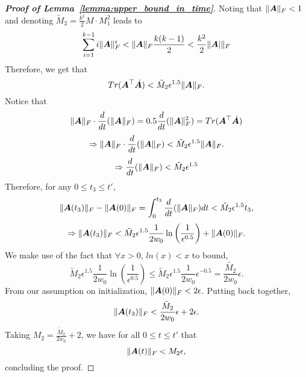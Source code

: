 \begin{proof}[\textbf{Proof of Lemma~\ref{lemma:upper_bound_in_time}}]
Noting that $\|{\bm{A}}\|_F <1$ and denoting $\tilde{M}_2 = \frac{k^2}{2} M \cdot M_1^2$ leads to
\begin{equation}
    \sum_{i=1}^{k-1}  i \|{\bm{A}}\|_F^i < \|{\bm{A}}\|_F \frac{k(k-1)}{2} < \frac{k^2}{2} \|{\bm{A}}|\|_F
\end{equation}
Therefore, we get that
\begin{equation}
 Tr({\bm{A}}^\top \dot{{\bm{A}}}) < \tilde{M}_2 \epsilon^{1.5}  \|{\bm{A}}\|_F.
\end{equation}
Notice that
\begin{equation}
    \|{\bm{A}}\|_F \cdot \frac{d}{dt}(\|{\bm{A}}\|_F)  =0.5 \frac{d}{dt}(\|{\bm{A}}\|_F^2) = Tr({\bm{A}}^\top \dot{{\bm{A}}})
\end{equation}
%
\begin{equation}
    \Rightarrow \|{\bm{A}}\|_F \cdot \frac{d}{dt}(\|{\bm{A}}\|_F) < \tilde{M}_2 \epsilon^{1.5}  \|{\bm{A}}\|_F.
\end{equation}
\begin{equation}
    \Rightarrow \frac{d}{dt}(\|{\bm{A}}\|_F) < \tilde{M}_2 \epsilon^{1.5}
\end{equation}
Therefore, for any $0 \leq t_3 \leq t'$,
%
\begin{equation}
    \|{\bm{A}}(t_3)\|_F-\|{\bm{A}}(0)\|_F = \int_0^{t_3} \frac{d}{dt}(\|{\bm{A}}\|_F) dt< \tilde{M}_2 \epsilon^{1.5} t_3,
\end{equation}
%
\begin{equation}
    \Rightarrow \|{\bm{A}}(t_3)\|_F < \tilde{M}_2 \epsilon^{1.5} \frac{1}{2w_0}\ln{\left(\frac{1}{\epsilon^{0.5}}\right)} + \|{\bm{A}}(0)\|_F.
\end{equation}
We make use of the fact that $\forall x>0$, $ln(x)<x$ to bound,
\begin{equation}
    \tilde{M}_2 \epsilon^{1.5} \frac{1}{2w_0}\ln{\left(\frac{1}{\epsilon^{0.5}}\right)}\le \tilde{M}_2 \epsilon^{1.5}\frac{1}{2w_0}\epsilon^{-0.5}=\frac{\tilde{M_2}}{2w_0}\epsilon.
\end{equation}
From our assumption on initialization, $\|{\bm{A}}(0)\|_F<2\epsilon$. Putting back together,
\begin{equation}
    \|{\bm{A}}(t_3)\|_F < \frac{\tilde{M}_2}{2w_0} \epsilon + 2 \epsilon.
\end{equation}
Taking $M_2=\frac{\tilde{M}_2}{2w_0}+ 2$, we have for all $0 \leq t \leq t'$ that
\begin{equation}
    \|{\bm{A}}(t)\|_F < M_2 \epsilon,
\end{equation}
concluding the proof.

\end{proof}

